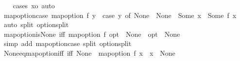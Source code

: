 \begin{isabellebody}
%
\isadelimproof
\ \ %
\endisadelimproof
%
\isatagproof
{}\isamarkupfalse%
\ {\isacharparenleft}{\kern0pt}cases\ xo{\isacharparenright}{\kern0pt}\ auto%
\endisatagproof
{\isafoldproof}%
%
\isadelimproof
\isanewline
%
\endisadelimproof
\isanewline
{}\isamarkupfalse%
\ map{\isacharunderscore}{\kern0pt}option{\isacharunderscore}{\kern0pt}case{\isacharcolon}{\kern0pt}\ {\isachardoublequoteopen}map{\isacharunderscore}{\kern0pt}option\ f\ y\ {\isacharequal}{\kern0pt}\ {\isacharparenleft}{\kern0pt}case\ y\ of\ None\ {\isasymRightarrow}\ None\ {\isacharbar}{\kern0pt}\ Some\ x\ {\isasymRightarrow}\ Some\ {\isacharparenleft}{\kern0pt}f\ x{\isacharparenright}{\kern0pt}{\isacharparenright}{\kern0pt}{\isachardoublequoteclose}\isanewline
%
\isadelimproof
\ \ %
\endisadelimproof
%
\isatagproof
{}\isamarkupfalse%
\ {\isacharparenleft}{\kern0pt}auto\ split{\isacharcolon}{\kern0pt}\ option{\isachardot}{\kern0pt}split{\isacharparenright}{\kern0pt}%
\endisatagproof
{\isafoldproof}%
%
\isadelimproof
\isanewline
%
\endisadelimproof
\isanewline
{}\isamarkupfalse%
\ map{\isacharunderscore}{\kern0pt}option{\isacharunderscore}{\kern0pt}is{\isacharunderscore}{\kern0pt}None\ {\isacharbrackleft}{\kern0pt}iff{\isacharbrackright}{\kern0pt}{\isacharcolon}{\kern0pt}\ {\isachardoublequoteopen}{\isacharparenleft}{\kern0pt}map{\isacharunderscore}{\kern0pt}option\ f\ opt\ {\isacharequal}{\kern0pt}\ None{\isacharparenright}{\kern0pt}\ {\isacharequal}{\kern0pt}\ {\isacharparenleft}{\kern0pt}opt\ {\isacharequal}{\kern0pt}\ None{\isacharparenright}{\kern0pt}{\isachardoublequoteclose}\isanewline
%
\isadelimproof
\ \ %
\endisadelimproof
%
\isatagproof
{}\isamarkupfalse%
\ {\isacharparenleft}{\kern0pt}simp\ add{\isacharcolon}{\kern0pt}\ map{\isacharunderscore}{\kern0pt}option{\isacharunderscore}{\kern0pt}case\ split{\isacharcolon}{\kern0pt}\ option{\isachardot}{\kern0pt}split{\isacharparenright}{\kern0pt}%
\endisatagproof
{\isafoldproof}%
%
\isadelimproof
\isanewline
%
\endisadelimproof
\isanewline
{}\isamarkupfalse%
\ None{\isacharunderscore}{\kern0pt}eq{\isacharunderscore}{\kern0pt}map{\isacharunderscore}{\kern0pt}option{\isacharunderscore}{\kern0pt}iff\ {\isacharbrackleft}{\kern0pt}iff{\isacharbrackright}{\kern0pt}{\isacharcolon}{\kern0pt}\ {\isachardoublequoteopen}None\ {\isacharequal}{\kern0pt}\ map{\isacharunderscore}{\kern0pt}option\ f\ x\ {\isasymlongleftrightarrow}\ x\ {\isacharequal}{\kern0pt}\ None{\isachardoublequoteclose}\isanewline
%
\isadelimproof
%
\endisadelimproof
%
\isatagproof
{}\isamarkupfalse%

\end{isabellebody}
